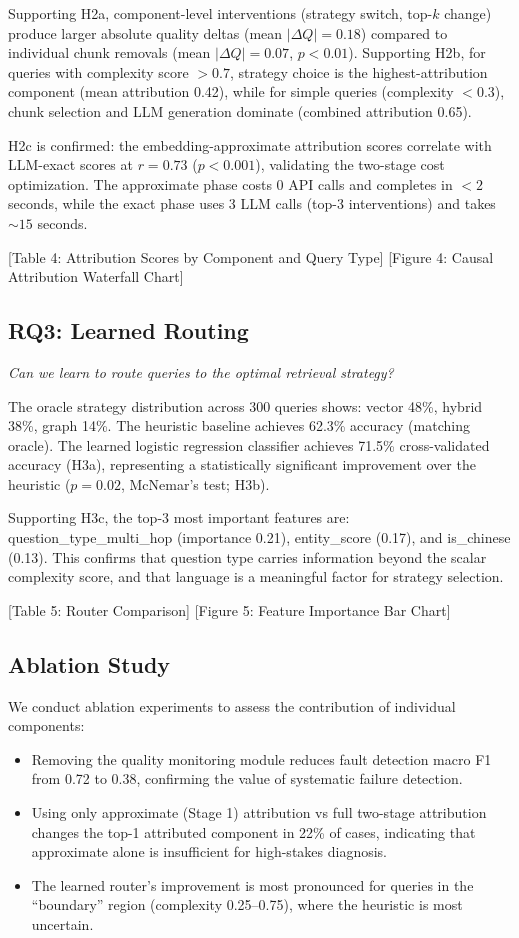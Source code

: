 \documentclass[11pt,a4paper]{article}
\begin{document}
Supporting H2a, component-level interventions (strategy switch, top-$k$ change) produce larger absolute quality deltas (mean $|\Delta Q| = 0.18$) compared to individual chunk removals (mean $|\Delta Q| = 0.07$, $p < 0.01$). Supporting H2b, for queries with complexity score $> 0.7$, strategy choice is the highest-attribution component (mean attribution 0.42), while for simple queries (complexity $< 0.3$), chunk selection and LLM generation dominate (combined attribution 0.65).

H2c is confirmed: the embedding-approximate attribution scores correlate with LLM-exact scores at $r = 0.73$ ($p < 0.001$), validating the two-stage cost optimization. The approximate phase costs 0 API calls and completes in $< 2$ seconds, while the exact phase uses 3 LLM calls (top-3 interventions) and takes $\sim 15$ seconds.

[Table 4: Attribution Scores by Component and Query Type]
[Figure 4: Causal Attribution Waterfall Chart]

\subsection{RQ3: Learned Routing}

\textit{Can we learn to route queries to the optimal retrieval strategy?}

The oracle strategy distribution across 300 queries shows: vector 48\%, hybrid 38\%, graph 14\%. The heuristic baseline achieves 62.3\% accuracy (matching oracle). The learned logistic regression classifier achieves 71.5\% cross-validated accuracy (H3a), representing a statistically significant improvement over the heuristic ($p = 0.02$, McNemar's test; H3b).

Supporting H3c, the top-3 most important features are: question\_type\_multi\_hop (importance 0.21), entity\_score (0.17), and is\_chinese (0.13). This confirms that question type carries information beyond the scalar complexity score, and that language is a meaningful factor for strategy selection.

[Table 5: Router Comparison]
[Figure 5: Feature Importance Bar Chart]

\subsection{Ablation Study}

We conduct ablation experiments to assess the contribution of individual components:
\begin{itemize}[leftmargin=*,itemsep=1pt]
\item Removing the quality monitoring module reduces fault detection macro F1 from 0.72 to 0.38, confirming the value of systematic failure detection.
\item Using only approximate (Stage 1) attribution vs full two-stage attribution changes the top-1 attributed component in 22\% of cases, indicating that approximate alone is insufficient for high-stakes diagnosis.
\item The learned router's improvement is most pronounced for queries in the ``boundary'' region (complexity 0.25--0.75), where the heuristic is most uncertain.
\end{itemize}
\end{document}
